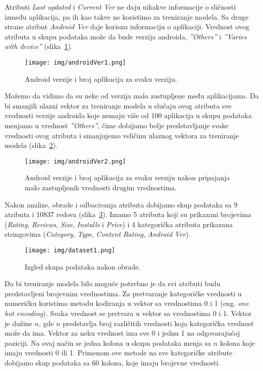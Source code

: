 \documentclass[a4paper,12pt,titlepage]{article}
\begin{document}
Atributi \emph{Last updated} i \emph{Current Ver} ne daju nikakve informacije o sličnosti između aplikacija, pa ih kao takve ne koristimo za treniranje modela. Sa druge strane atribut \emph{Android Ver} daje korisnu informaciju o aplikaciji. Vrednost ovog atributa u skupu podataka može da bude verzija androida, \emph{''Others''} i \emph{''Varies with device''} (slika~\ref{AndroidVer}).

\begin{figure}[ht!]
\centering
\texttt{[image: img/androidVer1.png]}
\caption{Android verzije i broj aplikacija za svaku verziju.}
\label{AndroidVer}
\end{figure} 

Možemo da vidimo da su neke od verzija malo zastupljene među aplikacijama. Da bi smanjili ulazni vektor za treniranje modela u slučaju ovog atributa sve vrednosti verzije androida koje nemaju više od 100 aplikacija u skupu podataka menjamo u vrednost \emph{''Others''}, čime dobijamo bolje predstavljanje svake vrednosti ovog atributa i smanjujemo veličinu ulaznog vektora za treniranje modela (slika~\ref{AndroidVer1}). 

\begin{figure}[ht!]
\centering
\texttt{[image: img/androidVer2.png]}
\caption{Android verzije i broj aplikacija za svaku verziju nakon pripajanja malo zastupljenih vrednosti drugim vrednostima.}
\label{AndroidVer1}
\end{figure} 

Nakon analize, obrade i odbacivanja atributa dobijamo skup podataka sa 9 atributa i 10837 redova (slika~\ref{Dataset1}). Imamo 5 atributa koji su prikazani brojevima (\emph{Rating}, \emph{Reviews}, \emph{Size}, \emph{Installs} i \emph{Price}) i 4 kategorička atributa prikazana stringovima (\emph{Category}, \emph{Type}, \emph{Content Rating}, \emph{Android Ver}). 

\begin{figure}[ht!]
\centering
\texttt{[image: img/dataset1.png]}
\caption{Izgled skupa podataka nakon obrade.}
\label{Dataset1}
\end{figure} 

Da bi treniranje modela bilo moguće potrebno je da svi atributi budu predstavljeni brojevnim vrednostima. Za pretvaranje kategoričke vrednosti u numeričku koristimo metodu kodiranja u vektor sa vrednostima 0 i 1 (eng. \emph{one hot encoding}). Svaka vrednost se pretvara u vektor sa vrednostima 0 i 1. Vektor je dužine $n$, gde $n$ predstavlja broj različitih vrednosti koja kategorička vrednost može da ima. Vektor za neku vrednost ima sve 0 i jednu 1 na odgovarajućoj poziciji. Na ovaj način se jedna kolona u skupu podataka menja sa $n$ kolona koje imaju vrednosti 0 ili 1. Primenom ove metode na sve kategoričke atribute dobijamo skup podataka sa 60 kolona, koje imaju brojevne vrednosti. 
\end{document}
